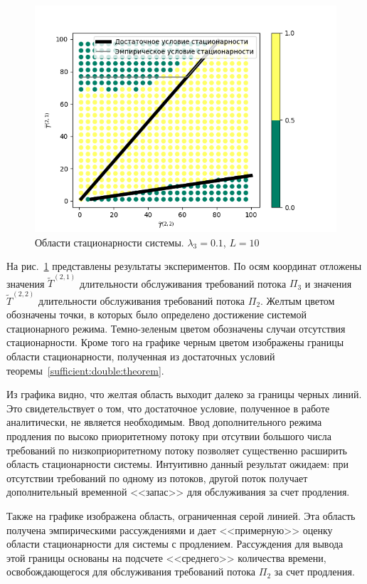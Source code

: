 \begin{figure}[h]
\centering
\includegraphics[scale=0.85]{Pictures/0_1_thres_10_target_fact.png} 
\caption{Области стационарности системы. $\lambda_3=0.1$, $L=10$}
\label{Experiment:stationar}
\end{figure}
На рис.~\ref{Experiment:stationar} представлены результаты экспериментов. По осям координат отложены значения $\widetilde T^{(2,1)}$ длительности обслуживания требований потока $\Pi_3$ и значения $\widetilde T^{(2,2)}$ длительности обслуживания требований потока $\Pi_2$. Желтым цветом обозначены точки, в которых было определено достижение системой стационарного режима. Темно-зеленым цветом обозначены случаи отсутствия стационарности. Кроме того на графике черным цветом изображены границы области стационарности, полученная из достаточных условий теоремы~\ref{sufficient:double:theorem}. 

Из графика видно, что желтая область выходит далеко за границы черных линий. Это свидетельствует о том, что достаточное условие, полученное в работе аналитически, не является необходимым. Ввод дополнительного режима продления по высоко приоритетному потоку при отсутвии большого числа требований по низкоприоритетному потоку позволяет существенно расширить область стационарности системы. Интуитивно данный результат ожидаем: при отсутствии требований по одному из потоков, другой поток получает дополнительный временной <<запас>> для обслуживания за счет продления.

Также на графике изображена область, ограниченная серой линией. Эта область получена эмпирическими рассуждениями и дает <<примерную>> оценку области стационарности для системы с продлением. Рассуждения для вывода этой границы основаны на подсчете <<среднего>> количества времени, освобождающегося для обслуживания требований потока $\Pi_2$ за счет продления.

